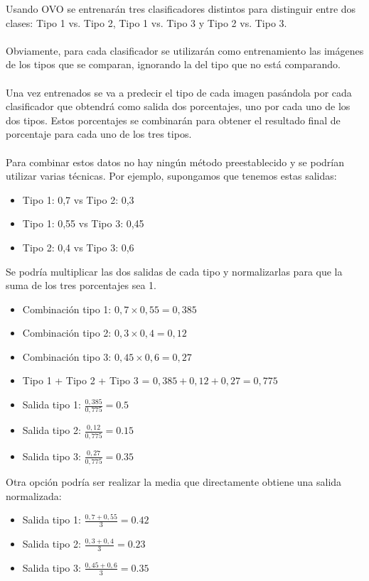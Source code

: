 Usando OVO se entrenarán tres clasificadores distintos para distinguir entre dos clases: Tipo 1 vs. Tipo 2, Tipo 1 vs. Tipo 3 y Tipo 2 vs. Tipo 3.
\\ \\
Obviamente, para cada clasificador se utilizarán como entrenamiento las imágenes de los tipos que se comparan, ignorando la del tipo que no está comparando.
\\ \\
Una vez entrenados se va a predecir el tipo de cada imagen pasándola por cada clasificador que obtendrá como salida dos porcentajes, uno por cada uno de los dos tipos. Estos porcentajes se combinarán para obtener el resultado final de porcentaje para cada uno de los tres tipos.
\\ \\
Para combinar estos datos no hay ningún método preestablecido y se podrían utilizar varias técnicas. Por ejemplo, supongamos que tenemos estas salidas:

\begin{itemize}
	\item Tipo 1: 0,7 vs Tipo 2: 0,3
	\item Tipo 1: 0,55 vs Tipo 3: 0,45
	\item Tipo 2: 0,4 vs Tipo 3: 0,6
\end{itemize}

Se podría multiplicar las dos salidas de cada tipo y normalizarlas para que la suma de los tres porcentajes sea 1.

\begin{itemize}
	\item Combinación tipo 1: $ 0,7 \times 0,55 = 0,385 $
	\item Combinación tipo 2: $ 0,3 \times 0,4 = 0,12 $
	\item Combinación tipo 3: $ 0,45 \times 0,6 = 0,27 $
	\item Tipo 1 + Tipo 2 + Tipo 3 = $ 0,385 + 0,12 + 0,27 = 0,775 $
	\item Salida tipo 1: $ \frac{0,385}{0,775} = 0.5 $
	\item Salida tipo 2: $ \frac{0,12}{0,775} = 0.15 $
	\item Salida tipo 3: $ \frac{0,27}{0,775} = 0.35 $
\end{itemize}

Otra opción podría ser realizar la media que directamente obtiene una salida normalizada:

\begin{itemize}
	\item Salida tipo 1: $ \frac{0,7 + 0,55}{3} = 0.42 $
	\item Salida tipo 2: $ \frac{0,3 + 0,4}{3} = 0.23 $
	\item Salida tipo 3: $ \frac{0,45 + 0,6}{3} = 0.35 $
\end{itemize}


